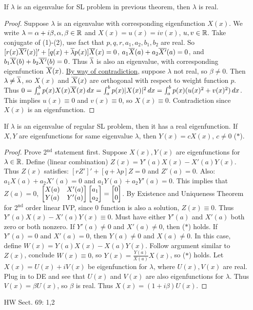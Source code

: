\documentclass[]{article}
\begin{document}
\begin{theorem}
	If $\lambda$ is an eigenvalue for SL problem in previous theorem, then $\lambda$ is real.
\end{theorem}
\begin{proof}
	Suppose $\lambda$ is an eigenvalue with corresponding eigenfunction $X(x)$. We write $\lambda = \alpha + i\beta, \alpha,\beta\in\mathbb{R}$ and $X(x) = u(x) = iv(x)$, $u,v\in\mathbb{R}$.
	Take conjugate of (1)-(2), use fact that $p,q,r,a_1,a_2,b_1,b_2$ are real. So $[r(x) \overline{X'}(x)]' + [q(x) + \overline{\lambda} p(x)] \overline{X}(x) = 0$, $a_1\overline{X}(a) + a_2 \overline{X'}(a) = 0$, and $b_1 \overline{X}(b) + b_2\overline{X'}(b) = 0$. Thus $\overline{\lambda}$ is also an eigenvalue, with corresponding eigenfunction $\overline{X}(x)$. \underline{By way of contradiction}, suppose $\lambda$ not real, so $\beta\neq 0$. Then $\lambda \neq \overline{\lambda}$, so $X(x)$ and $\overline{X}(x)$ are orthogonal with respect to weight function $p$. Thus $0 = \int_a^b p(x) X(x) \overline{X}(x) \, dx = \int_a^b p(x) |X(x)|^2 \, dx = \int_a^b p(x) (u(x)^2 + v(x)^2)\, dx$. This implies $u(x) \equiv 0$ and $v(x) \equiv 0$, so $X(x) \equiv 0$. Contradiction since $X(x)$ is an eigenfunction.
\end{proof}
\begin{theorem}
	If $\lambda$ is an eigenvalue of regular SL problem, then it has a real eigenfunction. If $X,Y$ are eigenfunctions for same eigenvalue $\lambda$, then $Y(x) = cX(x)$, $c\neq 0$ ($*$).
\end{theorem}
\begin{proof}
	Prove 2$^\text{nd}$ statement first. Suppose $X(x), Y(x)$ are eigenfunctions for $\lambda\in\mathbb{R}$. Define (linear combination) $Z(x) = Y'(a) X(x) - X'(a) Y(x)$. Thus $Z(x)$ satisfies: $[rZ']' + [q+\lambda p] Z = 0$ and $Z'(a) = 0$. Also: $a_1 X(a) + a_2 X'(a) = 0$ and $a_1Y(a) + a_2Y'(a) = 0$. This implies that $Z(a) = 0$, $\begin{bmatrix} X(a) & X'(a) \\ Y(a) & Y'(a)\end{bmatrix} \begin{bmatrix} a_1 \\ a_2\end{bmatrix} = \begin{bmatrix}0\\0\end{bmatrix}$. By Existence and Uniqueness Theorem for 2$^\text{nd}$ order linear IVP, since 0 function is also a solution, $Z(x) \equiv 0$. Thus $Y'(a) X(x) - X'(a) Y(x) \equiv 0$. Must have either $Y'(a)$ and $X'(a)$ both zero or both nonzero. If $Y'(a)\neq 0$ and $X'(a)\neq0$, then ($*$) holds. If $Y'(a) = 0$ and $X'(a) = 0$, then $Y(a)\neq0$ and $X(a)\neq0$. In this case, define $W(x) = Y(a) X(x) - X(a) Y(x)$. Follow argument similar to $Z(x)$, conclude $W(x)\equiv0$, so $Y(x) = \frac{Y(a)}{X(a)} X(x)$, so ($*$) holds. Let $X(x) = U(x) + iV(x)$ be eigenfunction for $\lambda$, where $U(x),V(x)$ are real. Plug in to DE and see that $U(x)$ and $V(x)$ are also eigenfunctions for $\lambda$. Thus $V(x) = \beta U(x)$, so $\beta$ is real. Thus $X(x) = (1+ i\beta) U(x)$.
\end{proof}
HW Sect. 69: 1,2
\end{document}
